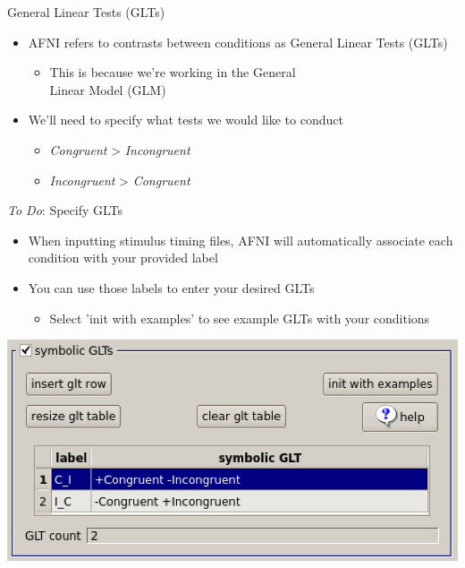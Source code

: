 \documentclass[t,12pt]{beamer}
\begin{document}
\begin{frame}{General Linear Tests (GLTs)}
\vspace{10pt}
\begin{itemize}
\setlength\itemsep{1em}
\item AFNI refers to contrasts between conditions as General Linear Tests (GLTs)
\vspace{4pt}
\begin{itemize}
\item This is because we're working in the General \\ Linear Model (GLM)
\end{itemize}
\item We'll need to specify what tests we would like to conduct
\vspace{4pt}
\begin{itemize}
\item \textit{Congruent} > \textit{Incongruent} 
\item \textit{Incongruent} > \textit{Congruent} 
\end{itemize}
\end{itemize}
\end{frame}

\begin{frame}{\emph{To Do}: Specify GLTs}
\vspace{10pt}
\begin{itemize}
\setlength\itemsep{1em}
\item When inputting stimulus timing files, AFNI will automatically associate each condition with your provided label
\item You can use those labels to enter your desired GLTs
\vspace{4pt}
\begin{itemize}
\item Select 'init with examples' to see example GLTs with your conditions 
\end{itemize}
\end{itemize}
\vspace{6pt}
\centering
\includegraphics[width=.65\textwidth]{images/GLT_spec.png}
\end{frame}
\end{document}
